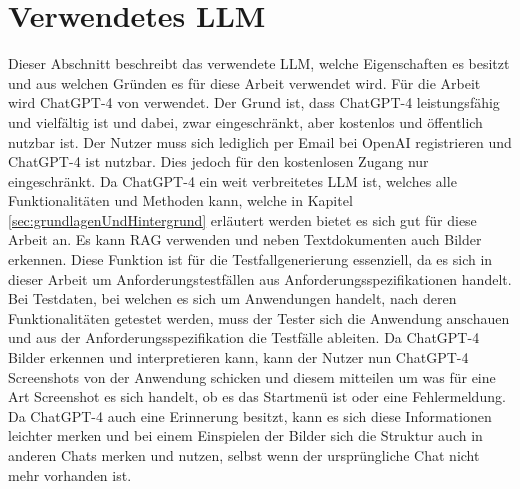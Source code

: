 \documentclass[12pt,toc=bib,toc=listof]{scrreprt}
\begin{document}
\section{Verwendetes LLM} %
\label{sec:verwendetesLLM}
Dieser Abschnitt beschreibt das verwendete LLM, welche Eigenschaften es besitzt und aus welchen Gründen es für diese Arbeit verwendet wird. Für die Arbeit wird ChatGPT-4 von \textcite{OpenAI2025} verwendet. Der Grund ist, dass ChatGPT-4 leistungsfähig und vielfältig ist und dabei, zwar eingeschränkt, aber kostenlos und öffentlich nutzbar ist. Der Nutzer muss sich lediglich per Email bei OpenAI registrieren und ChatGPT-4 ist nutzbar. Dies jedoch für den kostenlosen Zugang nur eingeschränkt. Da ChatGPT-4 ein weit verbreitetes LLM ist, welches alle Funktionalitäten und Methoden kann, welche in Kapitel \ref{sec:grundlagenUndHintergrund} erläutert werden bietet es sich gut für diese Arbeit an. Es kann RAG verwenden und neben Textdokumenten auch Bilder erkennen. Diese Funktion ist für die Testfallgenerierung essenziell, da es sich in dieser Arbeit um Anforderungstestfällen aus Anforderungsspezifikationen handelt. Bei Testdaten, bei welchen es sich um Anwendungen handelt, nach deren Funktionalitäten getestet werden, muss der Tester sich die Anwendung anschauen und aus der Anforderungsspezifikation die Testfälle ableiten. Da ChatGPT-4 Bilder erkennen und interpretieren kann, kann der Nutzer nun ChatGPT-4 Screenshots von der Anwendung schicken und diesem mitteilen um was für eine Art Screenshot es sich handelt, ob es das Startmenü ist oder eine Fehlermeldung. Da ChatGPT-4 auch eine Erinnerung besitzt, kann es sich diese Informationen leichter merken und bei einem Einspielen der Bilder sich die Struktur auch in anderen Chats merken und nutzen, selbst wenn der ursprüngliche Chat nicht mehr vorhanden ist. 
\end{document}
